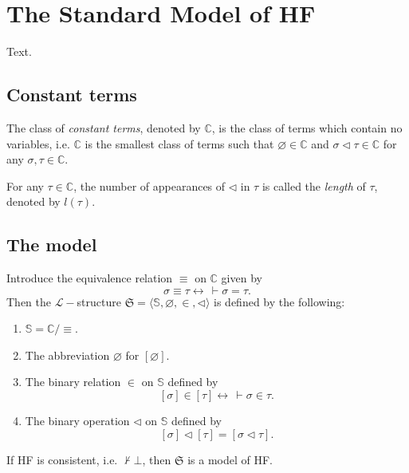 \chapter{The Standard Model of HF}

Text.

\section{Constant terms}

\begin{definition}
    \label{def:C}
    The class of \textit{constant terms}, denoted by $\mathbb{C}$, is the class of terms which
    contain no variables, i.e. $\mathbb{C}$ is the smallest class of terms such that 
    $\varnothing \in \mathbb{C}$ and 
    $\sigma \lhd \tau \in \mathbb{C}$ for any $\sigma, \tau \in \mathbb{C}$.

    For any $\tau \in \mathbb{C}$, the number of appearances of $\lhd$ in $\tau$ is called the
    \textit{length} of $\tau$, denoted by $l(\tau)$.
\end{definition}

\section{The model}

\begin{definition}
    \label{def:stdModel}
    \leanok
    Introduce the equivalence relation $\equiv$ on $\mathbb{C}$ given by
    $$
    \sigma \equiv \tau \leftrightarrow \,\vdash \sigma = \tau.
    $$
    Then the $\mathcal{L}-$structure 
    $\mathfrak{S} = \langle\mathbb{S}, \varnothing, \in, \lhd \rangle$ is defined by the following:
    \begin{enumerate}
        \item $\mathbb{S} = \mathbb{C}/{\equiv}$.
        \item The abbreviation $\varnothing$ for $[\varnothing]$.
        \item The binary relation $\in$ on $\mathbb{S}$ defined by
                $$[\sigma] \in [\tau] \leftrightarrow \,\vdash \sigma \in \tau.$$
        \item The binary operation $\lhd$ on $\mathbb{S}$ defined by
                $$[\sigma] \lhd [\tau] = [\sigma \lhd \tau].$$
    \end{enumerate}
\end{definition}

\begin{theorem}
    \label{stdModel.model_of_consistent}
    \leanok
    If HF is consistent, i.e. $\not\vdash\bot$, then $\mathfrak{S}$ is a model of HF.
\end{theorem}